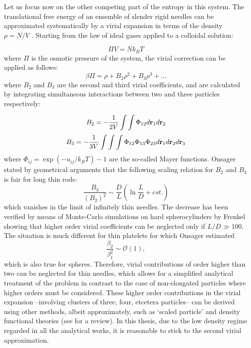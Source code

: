 Let us focus now on the other competing part of the entropy in this system. The translational free energy of an ensemble of slender rigid needles can be approximated systematically by a virial expansion in terms of the density $\rho=N/V$ \cite{hansenmacdonald}. Starting from the law of ideal gases applied to a colloidal solution:

\begin{equation}
\Pi V = N k_B T
\end{equation}
where $\Pi$ is the osmotic pressure of the system, the virial correction can be applied as follows:
\begin{equation}
\beta \Pi = \rho + B_2\rho^2 + B_3\rho^3 + \ldots
\end{equation}
where $B_2$ and $B_3$ are the second and third virial coefficients, and are calculated by integrating simultaneous interactions between two and three particles respectively:

\begin{equation}
B_2 = -\frac{1}{2V} \int \int \Phi_{12} d {\bf r}_1 d {\bf r}_2
 \label{B2}
\end{equation}
\begin{equation}
B_3 = -\frac{1}{3V} \int \int \int \Phi_{12} \Phi_{13} \Phi_{23} d {\bf r}_1 d {\bf r}_2 d {\bf r}_3
\end{equation}
where $\Phi_{ij} = \exp(-u_{ij}/k_BT)-1$ are the so-called Mayer functions. Onsager stated by geometrical arguments that the following scaling relation for $B_2$ and $B_3$ is fair for long thin rods:
\begin{equation}
\frac{B_3}{(B_2)^2} \sim \frac{D}{L}\left ( \ln \frac{L}{D} + cst. \right )
\end{equation}
which vanishes in the limit of infinitely thin needles. The decrease  has been  verified by means of Monte-Carlo simulations on hard spherocylinders by Frenkel \cite{Frenkel87,Frenkel87err} showing that higher order virial coefficients can be neglected only if $L/D\gg 100$. The situation is much different for thin platelets for which Onsager estimated
\begin{equation}
\frac{\beta_{2}}{\beta_{1}^{2}}\sim \mathcal{O}(1), \label{0clusterplate}
\end{equation}
which is also true for spheres. Therefore, virial contributions of order higher than two can be neglected for thin needles, which allows for a simplified analytical treatment of the problem in contrast to the case of non-elongated particles where higher orders must be considered. These higher order contributions in the virial expansion --involving clusters of three, four, etcetera particles-- can be derived using other methods, albeit approximately, such as `scaled particle' \cite{Cotterspt,Cotter} and density functional theories (see \cite{Vroege92,DFTspecialJPCM} for a review). In this thesis, due to the low density regime regarded in all the analytical works, it is reasonable to stick to the second virial approximation.

